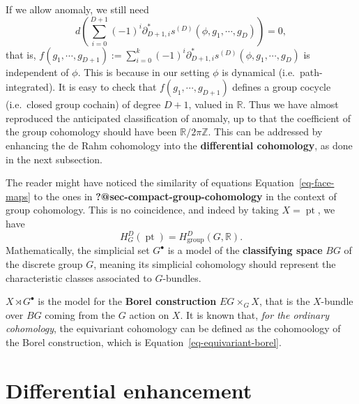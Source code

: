\documentclass[11pt,toc=bibliography]{scrbook}
\numberwithin{equation}{section}
\DeclareMathOperator{\pt}{pt}
\begin{document}
If we allow anomaly, we still need \[
d\left(\sum_{i=0}^{D+1} (-1)^{i} \partial_{D+1,i}^* s^{(D)}(\phi,g_1,\cdots,g_D)\right) = 0,
\] that is,
\(f(g_1,\cdots,g_{D+1}) := \sum_{i=0}^{k} (-1)^{i} \partial_{D+1,i}^* s^{(D)}(\phi,g_1,\cdots,g_D)\)
is independent of \(\phi\). This is because in our setting \(\phi\) is
dynamical (i.e.~path-integrated). It is easy to check that
\(f(g_1,\cdots,g_{D+1})\) defines a group cocycle (i.e.~closed group
cochain) of degree \(D+1\), valued in \(\mathbb{R}\). Thus we have
almost reproduced the anticipated classification of anomaly, up to that
the coefficient of the group cohomology should have been
\(\mathbb{R}/2\pi \mathbb{Z}\). This can be addressed by enhancing the
de Rahm cohomology into the \textbf{differential cohomology}, as done in
the next subsection.

\begin{tcolorbox}[enhanced jigsaw, opacityback=0, opacitybacktitle=0.6, leftrule=.75mm, arc=.35mm, coltitle=black, breakable, colframe=quarto-callout-note-color-frame, titlerule=0mm, colback=white, bottomrule=.15mm, left=2mm, colbacktitle=quarto-callout-note-color!10!white, toptitle=1mm, bottomtitle=1mm, title=\textcolor{quarto-callout-note-color}{\faInfo}\hspace{0.5em}{Relation to Group Cohomology and Borel Construction}, rightrule=.15mm, toprule=.15mm]

The reader might have noticed the similarity of equations
Equation~\ref{eq-face-maps} to the ones in
\textbf{?@sec-compact-group-cohomology} in the context of group
cohomology. This is no coincidence, and indeed by taking \(X=\pt\), we
have \[
H^D_G(\pt) = H^D_\text{group}(G,\mathbb{R}).
\] Mathematically, the simplicial set \(G^\bullet\) is a model of the
\textbf{classifying space} \(BG\) of the discrete group \(G\), meaning
its simplicial cohomology should represent the characteristic classes
associated to \(G\)-bundles.

\(X\rtimes G^\bullet\) is the model for the \textbf{Borel construction}
\(EG \times_G X\), that is the \(X\)-bundle over \(BG\) coming from the
\(G\) action on \(X\). It is known that, \emph{for the ordinary
cohomology}, the equivariant cohomology can be defined as the
cohomoology of the Borel construction, which is
Equation~\ref{eq-equivariant-borel}.

\end{tcolorbox}

\section{Differential enhancement}\label{sec-equivariant-differential}
\end{document}
